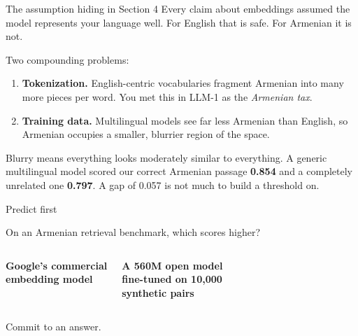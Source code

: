 \documentclass[aspectratio=169]{beamer}
\newcommand{\watchbox}[1]{%
  \begin{tcolorbox}[colback=armorange!12, colframe=armorange, boxrule=0.6pt, arc=2pt]
  #1
  \end{tcolorbox}}
\begin{document}
\begin{frame}{The assumption hiding in Section 4}
  \vspace{0.7em}
  Every claim about embeddings assumed the model represents your language well. For English
  that is safe. For Armenian it is not.

  \vspace{0.9em}
  Two compounding problems:

  \vspace{0.6em}
  \begin{enumerate}
    \item[\textbf{1.}] \textbf{Tokenization.} English-centric vocabularies fragment Armenian
      into many more pieces per word. You met this in LLM-1 as the
      \emph{Armenian tax}.
    \item[\textbf{2.}] \textbf{Training data.} Multilingual models see far less Armenian than
      English, so Armenian occupies a smaller, blurrier region of the space.
  \end{enumerate}

  \vspace{1.0em}
  \watchbox{Blurry means everything looks moderately similar to everything. A generic
  multilingual model scored our correct Armenian passage \textbf{0.854} and a completely
  unrelated one \textbf{0.797}. A gap of 0.057 is not much to build a threshold on.}
\end{frame}

\begin{frame}{Predict first}
  \vspace{1.4em}
  \begin{center}
    {\large On an Armenian retrieval benchmark, which scores higher?}
  \end{center}

  \vspace{1.4em}
  \begin{columns}[T]
      \begin{center}
      \begin{tcolorbox}[colback=lightbg, colframe=gray, boxrule=0.6pt, arc=2pt]
        \textbf{Google's commercial}\\\textbf{embedding model}
      \end{tcolorbox}
      \end{center}
      \begin{center}
      \begin{tcolorbox}[colback=lightbg, colframe=gray, boxrule=0.6pt, arc=2pt]
        \textbf{A 560M open model}\\\textbf{fine-tuned on 10{,}000}\\\textbf{synthetic pairs}
      \end{tcolorbox}
      \end{center}
  \end{columns}

  \vspace{1.6em}
  \begin{center}
  {\small\color{gray}Commit to an answer.}
  \end{center}
\end{frame}
\end{document}
